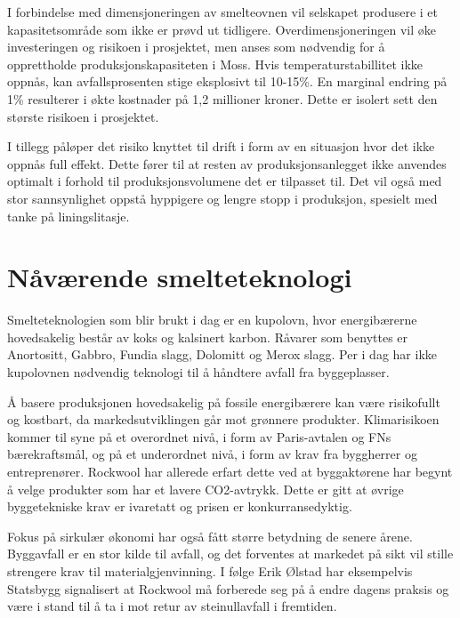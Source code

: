 \indent \newline
I forbindelse med dimensjoneringen av smelteovnen vil selskapet produsere i et kapasitetsområde som ikke er prøvd ut tidligere. Overdimensjoneringen vil øke investeringen og risikoen i prosjektet, men anses som nødvendig for å opprettholde produksjonskapasiteten i Moss. Hvis temperaturstabillitet ikke oppnås, kan avfallsprosenten stige eksplosivt til 10-15\%. En marginal endring på 1\% resulterer i økte kostnader på 1,2 millioner kroner. Dette er isolert sett den største risikoen i prosjektet.

\indent \newline
I tillegg påløper det risiko knyttet til drift i form av en situasjon hvor det ikke oppnås full effekt. Dette fører til at resten av produksjonsanlegget ikke anvendes optimalt i forhold til produksjonsvolumene det er tilpasset til. Det vil også med stor sannsynlighet oppstå hyppigere og lengre stopp i produksjon, spesielt med tanke på liningslitasje. 

\section{Nåværende smelteteknologi}
Smelteteknologien som blir brukt i dag er en kupolovn, hvor energibærerne hovedsakelig består av koks og kalsinert karbon. Råvarer som benyttes er Anortositt, Gabbro, Fundia slagg, Dolomitt og Merox slagg. Per i dag har ikke kupolovnen nødvendig teknologi til å håndtere avfall fra byggeplasser.

\indent \newline
Å basere produksjonen hovedsakelig på fossile energibærere kan være risikofullt og kostbart, da markedsutviklingen går mot grønnere produkter. Klimarisikoen kommer til syne på et overordnet nivå, i form av Paris-avtalen og FNs bærekraftsmål, og på et underordnet nivå, i form av krav fra byggherrer og entreprenører. Rockwool har allerede erfart dette ved at byggaktørene har begynt å velge produkter som har et lavere CO2-avtrykk. Dette er gitt at øvrige byggetekniske krav er ivaretatt og prisen er konkurransedyktig. 

\indent \newline
Fokus på sirkulær økonomi har også fått større betydning de senere årene. Byggavfall er en stor kilde til avfall, og det forventes at markedet på sikt vil stille strengere krav til materialgjenvinning. I følge Erik Ølstad har eksempelvis Statsbygg signalisert at Rockwool må forberede seg på å endre dagens praksis og være i stand til å ta i mot retur av steinullavfall i fremtiden. 


